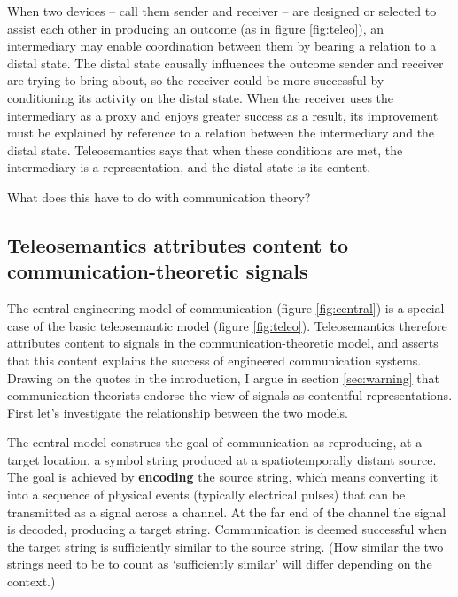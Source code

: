 \documentclass[12pt]{article}
\begin{document}
When two devices -- call them sender and receiver -- are designed or selected to assist each other in producing an outcome (as in figure \ref{fig:teleo}), an intermediary may enable coordination between them by bearing a relation to a distal state.
The distal state causally influences the outcome sender and receiver are trying to bring about, so the receiver could be more successful by conditioning its activity on the distal state.
When the receiver uses the intermediary as a proxy and enjoys greater success as a result, its improvement must be explained by reference to a relation between the intermediary and the distal state.
Teleosemantics says that when these conditions are met, the intermediary is a representation, and the distal state is its content.

What does this have to do with communication theory?

\subsection{Teleosemantics attributes content to communication-theoretic signals}

The central engineering model of communication (figure \ref{fig:central}) is a special case of the basic teleosemantic model (figure \ref{fig:teleo}).
Teleosemantics therefore attributes content to signals in the communication-theoretic model, and asserts that this content explains the success of engineered communication systems.
Drawing on the quotes in the introduction, I argue in section \ref{sec:warning} that communication theorists endorse the view of signals as contentful representations.
First let's investigate the relationship between the two models.

The central model construes the goal of communication as reproducing, at a target location, a symbol string produced at a spatiotemporally distant source.
The goal is achieved by \textbf{encoding} the source string, which means converting it into a sequence of physical events (typically electrical pulses) that can be transmitted as a signal across a channel.
At the far end of the channel the signal is decoded, producing a target string.
Communication is deemed successful when the target string is sufficiently similar to the source string.
(How similar the two strings need to be to count as `sufficiently similar' will differ depending on the context.)


\end{document}
